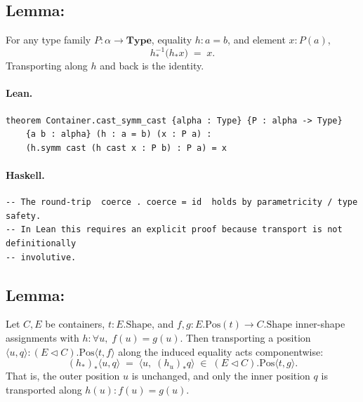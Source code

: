 \documentclass[11pt,a4paper]{article}
\begin{document}
\subsection{Lemma: }

\begin{prop}
For any type family $P : \alpha \to \mathbf{Type}$, equality $h : a = b$,
and element $x : P(a)$,
\[
  h^{-1}_*\bigl(h_* x\bigr) \;=\; x.
\]
Transporting along $h$ and back is the identity.
\end{prop}

\paragraph{Lean.}
\begin{lstlisting}[style=lean]
theorem Container.cast_symm_cast {alpha : Type} {P : alpha -> Type}
    {a b : alpha} (h : a = b) (x : P a) :
    (h.symm cast (h cast x : P b) : P a) = x
\end{lstlisting}

\paragraph{Haskell.}
\begin{lstlisting}[style=haskell]
-- The round-trip  coerce . coerce = id  holds by parametricity / type safety.
-- In Lean this requires an explicit proof because transport is not definitionally
-- involutive.
\end{lstlisting}


\subsection{Lemma: }

\begin{prop}
Let $C, E$ be containers, $t : E.\mathrm{Shape}$, and
$f, g : E.\mathrm{Pos}(t) \to C.\mathrm{Shape}$ inner-shape assignments with
$h : \forall u,\; f(u) = g(u)$.  Then transporting a position
$\langle u, q \rangle : (E \triangleleft C).\mathrm{Pos}\langle t, f \rangle$
along the induced equality acts componentwise:
\[
  (h_*)_*\langle u, q \rangle
  \;=\;
  \langle u,\; (h_u)_* q \rangle
  \;\in\;
  (E \triangleleft C).\mathrm{Pos}\langle t, g \rangle.
\]
That is, the outer position $u$ is unchanged, and only the inner position $q$
is transported along $h(u) : f(u) = g(u)$.
\end{prop}
\end{document}
